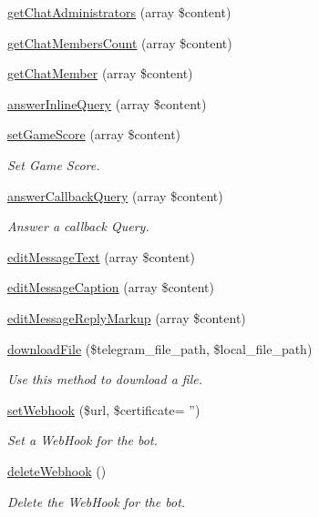 \begin{DoxyCompactItemize}
\hyperlink{class_telegram_a9ef409fa4668818b134c349553ccebd9}{get\-Chat\-Administrators} (array \$content)
\item 
\hyperlink{class_telegram_aaeb16972df57138d5efa3579085ebb5f}{get\-Chat\-Members\-Count} (array \$content)
\item 
\hyperlink{class_telegram_a744f71c0b62f310e2b2c665071509fec}{get\-Chat\-Member} (array \$content)
\item 
\hyperlink{class_telegram_aae2439e89943ccea30fd724ad5ae9a89}{answer\-Inline\-Query} (array \$content)
\item 
\hyperlink{class_telegram_adc67d74632a07c0f50875d8e35304463}{set\-Game\-Score} (array \$content)
\begin{DoxyCompactList}\small\item\em Set Game Score. \end{DoxyCompactList}\item 
\hyperlink{class_telegram_a55fa1d6bbcca385e333b402894e8ca37}{answer\-Callback\-Query} (array \$content)
\begin{DoxyCompactList}\small\item\em Answer a callback Query. \end{DoxyCompactList}\item 
\hyperlink{class_telegram_afbc4f6fd5f28a20e1bea0b083863b688}{edit\-Message\-Text} (array \$content)
\item 
\hyperlink{class_telegram_a3531b07c9dc7afb693c6e956e5debdad}{edit\-Message\-Caption} (array \$content)
\item 
\hyperlink{class_telegram_acd615562e6a6eeeb3d8a825eb03e3e5f}{edit\-Message\-Reply\-Markup} (array \$content)
\item 
\hyperlink{class_telegram_af08c6bc7982d71857f05c0756221a703}{download\-File} (\$telegram\-\_\-file\-\_\-path, \$local\-\_\-file\-\_\-path)
\begin{DoxyCompactList}\small\item\em Use this method to download a file. \end{DoxyCompactList}\item 
\hyperlink{class_telegram_a460bc346782ab380344e7fba7de6968c}{set\-Webhook} (\$url, \$certificate= '')
\begin{DoxyCompactList}\small\item\em Set a Web\-Hook for the bot. \end{DoxyCompactList}\item 
\hyperlink{class_telegram_ad90cef56fdc7dfcc40318a78bf5aed71}{delete\-Webhook} ()
\begin{DoxyCompactList}\small\item\em Delete the Web\-Hook for the bot. \end{DoxyCompactList}\item 

\end{DoxyCompactItemize}
